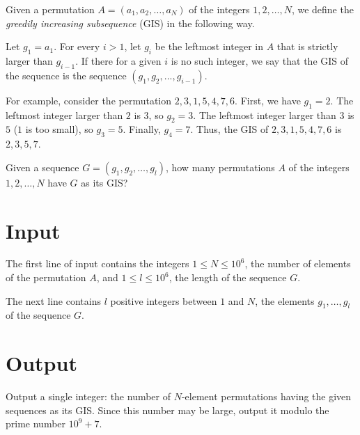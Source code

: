 Given a permutation $A = (a_1, a_2, \dots, a_N)$ of the integers $1, 2, \dots, N$, we define the \emph{greedily increasing subsequence} (GIS) in the following way.

Let $g_1 = a_1$. For every $i > 1$, let $g_i$ be the leftmost integer in $A$ that is strictly larger than $g_{i-1}$.
If there for a given $i$ is no such integer, we say that the GIS of the sequence is the sequence $(g_1, g_2, ..., g_{i - 1})$.

For example, consider the permutation $2, 3, 1, 5, 4, 7, 6$.
First, we have $g_1 = 2$.
The leftmost integer larger than $2$ is $3$, so $g_2 = 3$.
The leftmost integer larger than $3$ is $5$ ($1$ is too small), so $g_3 = 5$.
Finally, $g_4 = 7$.
Thus, the GIS of $2, 3, 1, 5, 4, 7, 6$ is $2, 3, 5, 7$.

Given a sequence $G = (g_1, g_2, \dots, g_l)$, how many permutations $A$ of the integers $1, 2, \dots, N$ have $G$ as its GIS?

\section*{Input}
The first line of input contains the integers $1 \le N \le 10^6$, the number of elements of the permutation $A$,
and $1 \le l \le 10^6$, the length of the sequence $G$.

The next line contains $l$ positive integers between $1$ and $N$, the elements $g_1, \dots, g_l$ of the sequence $G$.

\section*{Output}
Output a single integer: the number of $N$-element permutations having the given sequences as its GIS.
Since this number may be large, output it modulo the prime number $10^9 + 7$.
